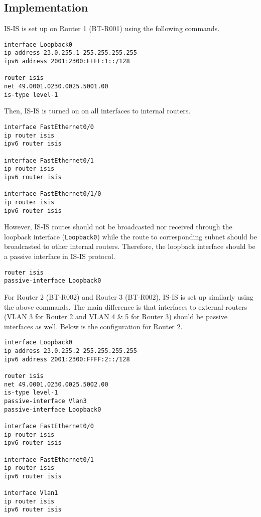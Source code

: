 \subsection{Implementation}

IS-IS is set up on Router 1 (BT-R001) using the following commands.

\begin{lstlisting}
interface Loopback0
ip address 23.0.255.1 255.255.255.255
ipv6 address 2001:2300:FFFF:1::/128

router isis
net 49.0001.0230.0025.5001.00
is-type level-1
\end{lstlisting}

Then, IS-IS is turned on on all interfaces to internal routers.

\begin{lstlisting}
interface FastEthernet0/0
ip router isis
ipv6 router isis

interface FastEthernet0/1
ip router isis
ipv6 router isis

interface FastEthernet0/1/0
ip router isis
ipv6 router isis
\end{lstlisting}

\clearpage

However, IS-IS routes should not be broadcasted nor received through the loopback interface (\texttt{Loopback0}) while the route to corresponding subnet should be broadcasted to other internal routers. Therefore, the loopback interface should be a passive interface in IS-IS protocol.

\begin{lstlisting}
router isis
passive-interface Loopback0
\end{lstlisting}

For Router 2 (BT-R002) and Router 3 (BT-R002), IS-IS is set up similarly using the above commands. The main difference is that interfaces to external routers (VLAN 3 for Router 2 and VLAN 4 \& 5 for Router 3) should be passive interfaces as well. Below is the configuration for Router 2.

\begin{lstlisting}
interface Loopback0
ip address 23.0.255.2 255.255.255.255
ipv6 address 2001:2300:FFFF:2::/128

router isis
net 49.0001.0230.0025.5002.00
is-type level-1
passive-interface Vlan3
passive-interface Loopback0

interface FastEthernet0/0
ip router isis
ipv6 router isis

interface FastEthernet0/1
ip router isis
ipv6 router isis

interface Vlan1
ip router isis
ipv6 router isis
\end{lstlisting}

